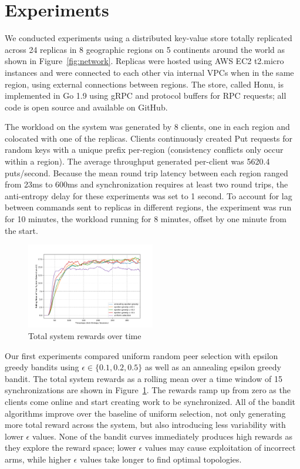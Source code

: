 \section*{Experiments}

We conducted experiments using a distributed key-value store totally
replicated across 24 replicas in 8 geographic regions on 5 continents
around the world as shown in Figure~\ref{fig:network}.
Replicas were hosted using AWS EC2 t2.micro instances and were connected to
each other via internal VPCs when in the same region, using external
connections between regions.
The store, called Honu, is implemented in Go 1.9 using gRPC and protocol
buffers for RPC requests; all code is open source and available on GitHub.

The workload on the system was generated by 8 clients, one in each region and
colocated with one of the replicas.
Clients continuously created Put requests for random keys with a unique
prefix per-region (consistency conflicts only occur within a region).
The average throughput generated per-client was 5620.4 puts/second.
Because the mean round trip latency between each region ranged from 23ms to
600ms and synchronization requires at least two round trips, the
anti-entropy delay for these experiments was set to 1 second.
To account for lag between commands sent to replicas in different regions,
the experiment was run for 10 minutes, the workload running for 8 minutes,
offset by one minute from the start.

\begin{figure}[t]
    \centering
    \includegraphics[width=0.5\textwidth]{figures/rewards}
    \caption{Total system rewards over time}
    \label{fig:system_rewards}
\end{figure}

Our first experiments compared uniform random peer selection with epsilon
greedy bandits using $\epsilon \in \{0.1, 0.2, 0.5\}$ as well as an annealing
epsilon greedy bandit.
The total system rewards as a rolling mean over a time window of 15
synchronizations are shown in Figure~\ref{fig:system_rewards}.
The rewards ramp up from zero as the clients come online and start
creating work to be synchronized.
All of the bandit algorithms improve over the baseline of uniform selection,
not only generating more total reward across the system, but also introducing
less variability with lower $\epsilon$ values.
None of the bandit curves immediately produces high rewards as they explore
the reward space; lower $\epsilon$ values may cause exploitation of incorrect
arms, while higher $\epsilon$ values take longer to find optimal topologies.

